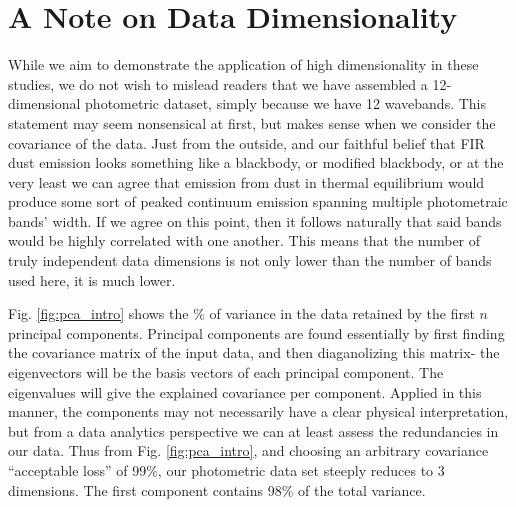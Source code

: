 \chapter*{A Note on Data Dimensionality}

While we aim to demonstrate the application of high dimensionality in these studies, we do not wish to mislead readers that we have assembled a 12-dimensional photometric dataset, simply because we have 12 wavebands. This statement may seem nonsensical at first, but makes sense when we consider the covariance of the data. Just from the outside, and our faithful belief that FIR dust emission looks something like a blackbody, or modified blackbody, or at the very least we can agree that emission from dust in thermal equilibrium would produce some sort of peaked continuum emission spanning multiple photometraic bands' width. If we agree on this point, then it follows naturally that said bands would be highly correlated with one another. This means that the number of truly independent data dimensions is not only lower than the number of bands used here, it is much lower.

Fig. \hyperref[fig:pca_intro]{\ref{fig:pca_intro}} shows the \% of variance in the data retained by the first $n$ principal components. Principal components are found essentially by first finding the covariance matrix of the input data, and then diaganolizing this matrix- the eigenvectors will be the basis vectors of each principal component. The eigenvalues will give the explained covariance per component. Applied in this manner, the components may not necessarily have a clear physical interpretation, but from a data analytics perspective we can at least assess the redundancies in our data. Thus from Fig. \hyperref[fig:pca_intro]{\ref{fig:pca_intro}}, and choosing an arbitrary covariance ``acceptable loss'' of 99\%, our photometric data set steeply reduces to 3 dimensions. The first component contains 98\% of the total variance.


